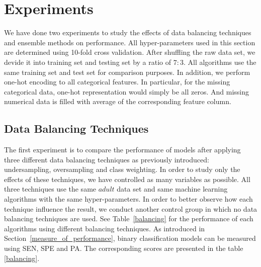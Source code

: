 \documentclass{article}
\begin{document}
\section{Experiments}
\label{experiments}

We have done two experiments to study the effects of data balancing techniques and ensemble methods on performance. All hyper-parameters used in this section are determined using 10-fold cross validation. After shuffling the raw data set, we devide it into training set and testing set by a ratio of $7:3$. All algorithms use the same training set and test set for comparison purposes. In addition, we perform one-hot encoding to all categorical features. In particular, for the missing categorical data, one-hot representation would simply be all zeros. And missing numerical data is filled with average of the corresponding feature column.

\subsection{Data Balancing Techniques}
\label{balancing_experiment}

The first experiment is to compare the performance of models after applying three different data balancing techniques as previously introduced: undersampling, oversampling and class weighting. In order to study only the effects of these techniques, we have controlled as many variables as possible. All three techniques use the same $adult$ data set and same machine learning algorithms with the same hyper-parameters. In order to better observe how each technique influence the result, we conduct another control group in which no data balancing techniques are used. See Table~\ref{balancing} for the performance of each algorithms using different balancing techniques. As introduced in Section~\ref{measure_of_performance}, binary classification models can be measured using SEN, SPE and PA. The corresponding scores are presented in the table \ref{balancing}. \\

\end{document}
